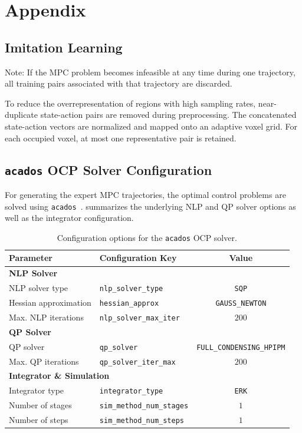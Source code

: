 \chapter{Appendix}
\label{ch:appendix}

\section{Imitation Learning}
Note:
If the MPC problem
becomes infeasible at any time during one trajectory, all training pairs
associated with that trajectory are discarded.

To reduce the overrepresentation of regions with high sampling rates, near-duplicate
state-action pairs are removed during preprocessing. The concatenated
state-action vectors are normalized and mapped onto an adaptive voxel grid.
For each occupied voxel, at most one representative pair is retained.

\section{\texorpdfstring{\texttt{acados}}{acados} OCP Solver Configuration}
\label{app:acados-config}
For generating the expert MPC trajectories, the optimal control problems are solved using \texttt{acados}~\cite{verschuerenAcadosModularOpensource2022}. 
 summarizes the underlying NLP and QP solver options as well as the integrator configuration.

\begin{table}[htbp]
    \centering
    \caption{Configuration options for the \texttt{acados} OCP solver.}
    \label{tab:app-acados-config}
    \begin{tabular}{llc}
        \toprule
        \textbf{Parameter} & \textbf{Configuration Key} & \textbf{Value} \\
        \midrule
        \multicolumn{3}{l}{\textbf{NLP Solver}} \\
        \midrule
        NLP solver type & \texttt{nlp\_solver\_type} & \texttt{SQP} \\
        Hessian approximation & \texttt{hessian\_approx} & \texttt{GAUSS\_NEWTON} \\
        Max. NLP iterations & \texttt{nlp\_solver\_max\_iter} & $200$ \\
        \midrule
        \multicolumn{3}{l}{\textbf{QP Solver}} \\
        \midrule
        QP solver & \texttt{qp\_solver} & \texttt{FULL\_CONDENSING\_HPIPM} \\
        Max. QP iterations & \texttt{qp\_solver\_iter\_max} & $200$ \\
        \midrule
        \multicolumn{3}{l}{\textbf{Integrator \& Simulation}} \\
        \midrule
        Integrator type & \texttt{integrator\_type} & \texttt{ERK} \\
        Number of stages & \texttt{sim\_method\_num\_stages} & $1$ \\
        Number of steps & \texttt{sim\_method\_num\_steps} & $1$ \\
        \bottomrule
    \end{tabular}
\end{table}


